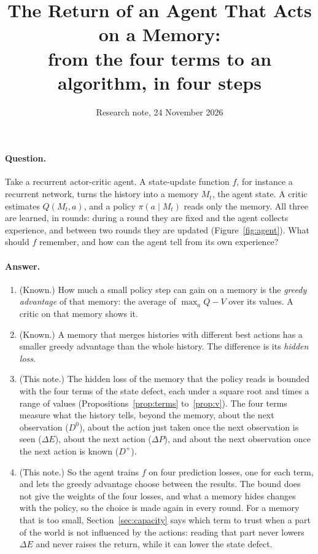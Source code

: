 \documentclass[11pt]{article}
\title{The Return of an Agent That Acts on a Memory:\\ from the four terms to an algorithm, in four steps}
\author{}
\date{Research note, 24 November 2026}
\theoremstyle{definition}
\newcommand{\dE}{\Delta E}
\newcommand{\dP}{\Delta P}
\begin{document}
\maketitle

\paragraph{Question.} Take a recurrent actor-critic agent. A state-update function $f$, for instance a recurrent network, turns the history into a memory $M_t$, the agent state. A critic estimates $Q(M_t,a)$, and a policy $\pi(a\mid M_t)$ reads only the memory. All three are learned, in rounds: during a round they are fixed and the agent collects experience, and between two rounds they are updated (Figure~\ref{fig:agent}). What should $f$ remember, and how can the agent tell from its own experience?

\paragraph{Answer.}
\begin{enumerate}
\item (Known.) How much a small policy step can gain on a memory is the \emph{greedy advantage} of that memory: the average of $\max_aQ-V$ over its values. A critic on that memory shows it.
\item (Known.) A memory that merges histories with different best actions has a smaller greedy advantage than the whole history. The difference is its \emph{hidden loss}.
\item (This note.) The hidden loss of the memory that the policy reads is bounded with the four terms of the state defect, each under a square root and times a range of values (Propositions~\ref{prop:terms} to~\ref{prop:v}). The four terms measure what the history tells, beyond the memory, about the next observation ($D^0$), about the action just taken once the next observation is seen ($\dE$), about the next action ($\dP$), and about the next observation once the next action is known ($D^+$).
\item (This note.) So the agent trains $f$ on four prediction losses, one for each term, and lets the greedy advantage choose between the results. The bound does not give the weights of the four losses, and what a memory hides changes with the policy, so the choice is made again in every round. For a memory that is too small, Section~\ref{sec:capacity} says which term to trust when a part of the world is not influenced by the actions: reading that part never lowers $\dE$ and never raises the return, while it can lower the state defect.
\end{enumerate}
\end{document}
